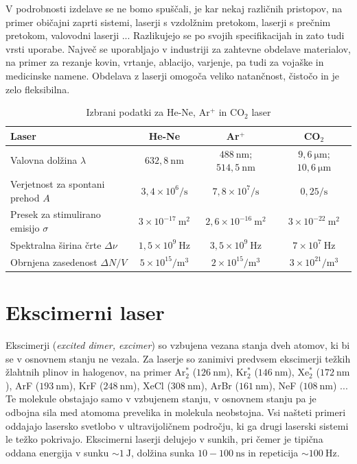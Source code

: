 V podrobnosti izdelave se ne bomo spuščali, je kar nekaj različnih pristopov, 
na primer običajni zaprti sistemi, laserji s vzdolžnim pretokom, laserji s prečnim pretokom,
valovodni laserji ... Razlikujejo se po svojih specifikacijah in zato tudi vrsti uporabe.
Največ se uporabljajo v industriji za zahtevne obdelave materialov, na primer za rezanje 
kovin, vrtanje, ablacijo, varjenje, pa tudi za vojaške in medicinske namene.
Obdelava z laserji omogoča veliko natančnost, čistočo in je zelo fleksibilna.

\begin{table}
\begin{center}
\begin{tabular}{|l|c|c|c|}\hline
Laser & He-Ne & Ar$^+$ & CO$_2$ \\ \hline
Valovna dolžina  $\lambda$ & $632,8~\si{\nano\metre}$& $488~\si{\nano\metre}$;
$514,5~\si{\nano\metre}$ & $9,6~\si{\micro\metre}$; $10,6~\si{\micro\metre}$
\\ \hline
Verjetnost za spontani prehod $A$ & $3,4 \times 10^6/\si{\second}$ & 
$7,8 \times 10^7/\si{\second}$ & $0,25/\si{\second}$  \\ \hline
Presek za stimulirano emisijo $\sigma$ & $3 \times 10^{-17}~\si{\metre}^2$&  $2,6 \times 10^{-16}~\si{\metre}^2$ & $3 \times 10^{-22}~\si{\metre}^2$ \\ \hline
Spektralna širina črte $\Delta \nu$ & $1,5 \times 10^{9}~\si{\hertz}$ & 
$3,5 \times 10^{9}~\si{\hertz}$ &$7 \times 10^{7}~\si{\hertz}$  \\ \hline
Obrnjena zasedenost $\Delta N/V$ & $5 \times 10^{15}/\si{\metre}^3$ & $2 \times 10^{15}/\si{\metre}^3$ & $3 \times 10^{21}/\si{\metre}^3$ \\ \hline
\end{tabular}
\caption{Izbrani podatki za He-Ne, Ar$^+$ in CO$_2$ laser}
\label{tab:Ar}
\end{center}
\end{table}

\section{Ekscimerni laser}

Ekscimerji ({\it excited dimer, excimer}) so vzbujena vezana stanja dveh atomov, 
ki bi se v osnovnem stanju ne vezala. Za laserje so zanimivi predvsem ekscimerji
težkih žlahtnih plinov in halogenov, na primer Ar$_2^*$ ($126~\si{\nano\metre}$), 
Kr$_2^*$ ($146~\si{\nano\metre}$), Xe$_2^*$ ($172~\si{\nano\metre}$),
ArF ($193~\si{\nano\metre}$), KrF ($248~\si{\nano\metre}$), 
XeCl ($308~\si{\nano\metre}$), ArBr ($161~\si{\nano\metre}$), 
NeF ($108~\si{\nano\metre}$) ... Te molekule obstajajo samo v vzbujenem stanju,
v osnovnem stanju pa je odbojna sila med atomoma prevelika in molekula neobstojna.
Vsi našteti primeri oddajajo lasersko svetlobo v
ultravijoličnem področju, ki ga drugi laserski sistemi le težko pokrivajo. 
Ekscimerni laserji delujejo v sunkih, pri čemer je tipična oddana energija v sunku 
$\sim 1~\si{\joule}$, dolžina sunka $10-100~\si{\nano\second}$ in repeticija 
$\sim 100~\si{\hertz}$.

